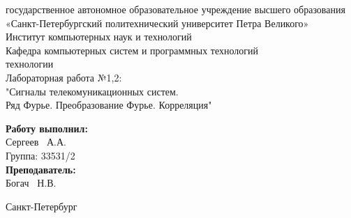 \documentclass[a4paper]{article}
\begin{document}

\begin{titlepage}	%

	\begin{center}		%

		 государственное автономное образовательное учреждение высшего образования «Санкт-Петербургский политехнический университет Петра Великого» \\
		\large Институт компьютерных наук и технологий \\
		\large Кафедра компьютерных систем и программных технологий\\[2cm]
		
	    \vfill
		 технологии\\[0.5cm] %
		\large Лабораторная работа №1,2:\\
		"Сигналы телекомуникационных систем.\\ Ряд Фурье. Преобразование Фурье. Корреляция"\\[4.8cm]

	\end{center}

	\begin{flushright} %
		\begin{minipage}{0.25\textwidth} %
			\begin{flushleft} %

				\large\textbf{Работу выполнил:}\\
				\large Сергеев ~А.А.\\
				\large {Группа:} 33531/2\\
				
				\large \textbf{Преподаватель:}\\
				\large Богач ~Н.В.\\

			\end{flushleft}
		\end{minipage}
	\end{flushright}
	
	\vfill %

	\begin{center}
	\large Санкт-Петербург\\
	\large \the\year %
	\end{center} %

\thispagestyle{empty} %
\end{titlepage} %
\vfill %
\end{document}
